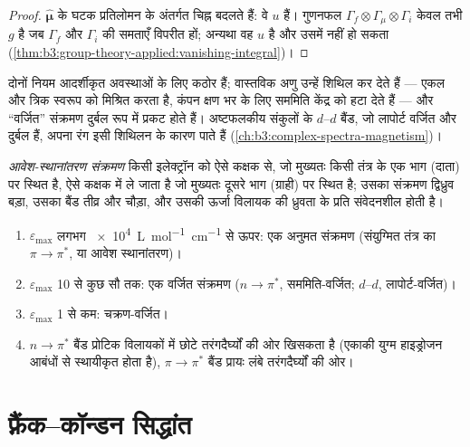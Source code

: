 \begin{proof}
$\hat{\boldsymbol\mu}$ के घटक प्रतिलोमन के अंतर्गत चिह्न बदलते हैं: वे $u$ हैं।
गुणनफल $\Gamma_f\otimes\Gamma_\mu\otimes\Gamma_i$ केवल तभी $g$ है जब $\Gamma_f$ और $\Gamma_i$
की समताएँ विपरीत हों; अन्यथा वह $u$ है और उसमें  नहीं हो सकता (\cref{thm:b3:group-theory-applied:vanishing-integral})।
\end{proof}

दोनों नियम आदर्शीकृत अवस्थाओं के लिए कठोर हैं; वास्तविक अणु उन्हें शिथिल कर देते हैं
---  एकल और त्रिक स्वरूप को मिश्रित करता है, कंपन
क्षण भर के लिए सममिति केंद्र को हटा देते हैं --- और ``वर्जित''
संक्रमण दुर्बल रूप में प्रकट होते हैं। अष्टफलकीय संकुलों के $d$--$d$ बैंड, जो लापोर्ट
वर्जित और दुर्बल हैं, अपना रंग इसी शिथिलन के कारण पाते हैं
(\cref{ch:b3:complex-spectra-magnetism})।

\begin{definition}\label{def:b3:electronic-spectroscopy:charge-transfer}
\emph{आवेश-स्थानांतरण संक्रमण} किसी इलेक्ट्रॉन को
ऐसे कक्षक से, जो मुख्यतः किसी तंत्र के एक भाग (दाता) पर स्थित है, ऐसे कक्षक में ले जाता है
जो मुख्यतः दूसरे भाग (ग्राही) पर स्थित है; उसका संक्रमण द्विध्रुव
बड़ा, उसका बैंड तीव्र और चौड़ा, और उसकी ऊर्जा विलायक की ध्रुवता के प्रति
संवेदनशील होती है।
\end{definition}

\begin{method}[अवशोषण बैंड का निर्धारण]\label{met:b3:electronic-spectroscopy:assign-band}
\begin{enumerate}
  \item $\varepsilon_{\max}$ लगभग \qty{e4}{L.mol^{-1}.cm^{-1}} से ऊपर: एक अनुमत
        संक्रमण (संयुग्मित तंत्र का $\pi\to\pi^*$, या आवेश स्थानांतरण)।
  \item $\varepsilon_{\max}$ 10 से कुछ सौ तक: एक वर्जित संक्रमण ($n\to\pi^*$,
        सममिति-वर्जित; $d$--$d$, लापोर्ट-वर्जित)।
  \item $\varepsilon_{\max}$ 1 से कम: चक्रण-वर्जित।
  \item $n\to\pi^*$ बैंड प्रोटिक विलायकों में छोटे तरंगदैर्घ्यों की ओर खिसकता है
        (एकाकी युग्म हाइड्रोजन आबंधों से स्थायीकृत होता है), $\pi\to\pi^*$ बैंड
        प्रायः लंबे तरंगदैर्घ्यों की ओर।
\end{enumerate}
\end{method}

\section{फ़्रैंक--कॉन्डन सिद्धांत}

